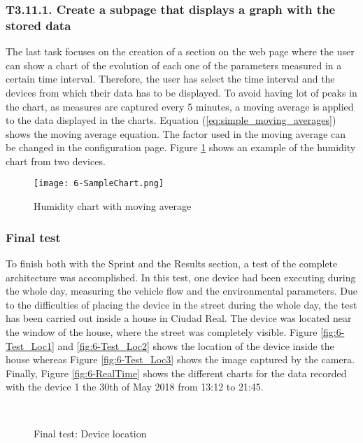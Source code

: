 \subsubsection{T3.11.1. Create a subpage that displays a graph with the stored data}
The last task focuses on the creation of a section on the web page where the user can show a chart of the evolution of each one of the parameters measured in a certain time interval. Therefore, the user has select the time interval and the devices from which their data has to be displayed. To avoid having lot of peaks in the chart, as measures are captured every 5 minutes, a moving average is applied to the data displayed in the charts. Equation (\ref{eq:simple_moving_averages}) shows the moving average equation. The factor used in the moving average can be changed in the configuration page. Figure \ref{fig:6-SampleChart} shows an example of the humidity chart from two devices.

\begin{figure}[!h]
	\begin{center}
		\texttt{[image: 6-SampleChart.png]}
		\caption{Humidity chart with moving average}
		\label{fig:6-SampleChart}
	\end{center}
\end{figure}


\subsubsection{Final test}
To finish both with the Sprint and the Results section, a test of the complete architecture was accomplished. In this test, one device had been executing during the whole day, measuring the vehicle flow and the environmental parameters. Due to the difficulties of placing the device in the street during the whole day, the test has been carried out inside a house in Ciudad Real. The device was located near the window of the house, where the street was completely visible. Figure \ref{fig:6-Test_Loc1} and \ref{fig:6-Test_Loc2} shows the location of the device inside the house whereas Figure \ref{fig:6-Test_Loc3} shows the image captured by the camera. Finally, Figure \ref{fig:6-RealTime} shows the different charts for the data recorded with the device 1 the 30th of May 2018 from 13:12 to 21:45.

\begin{figure}[htb]
	\centering
	\\
	\caption{Final test: Device location}
	\label{fig:6-Test_Loc}
\end{figure}

